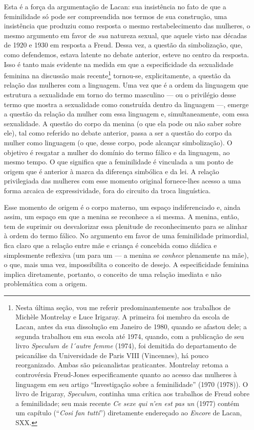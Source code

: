 Esta é a força da argumentação de Lacan: sua insistência no fato de que
a feminilidade só pode ser compreendida nos termos de sua construção,
uma insistência que produziu como resposta o mesmo restabelecimento das
mulheres, o mesmo argumento em favor de \emph{sua} natureza sexual, que
aquele visto nas décadas de 1920 e 1930 em resposta a Freud. Dessa vez,
a questão da simbolização, que, como defendemos, estava latente no
debate anterior, esteve no centro da resposta. Isso é tanto mais
evidente na medida em que a especificidade da sexualidade feminina na
discussão mais recente\footnote{Nesta última seção, vou me referir
  predominantemente aos trabalhos de Michèle Montrelay e Luce Irigaray.
  A primeira foi membro da escola de Lacan, antes da sua dissolução em
  Janeiro de 1980, quando se afastou dele; a segunda trabalhou em sua
  escola até 1974, quando, com a publicação de seu livro \emph{Speculum
  de l´autre femme} (1974), foi demitida do departamento de psicanálise
  da Universidade de Paris VIII (Vincennes), há pouco reorganizado.
  Ambas são psicanalistas praticantes. Montrelay retoma a controvérsia
  Freud-Jones especificamente quanto ao acesso das mulheres à linguagem
  em seu artigo ``Investigação sobre a feminilidade'' (1970 (1978)). O
  livro de Irigaray, \emph{Speculum}, continha uma crítica aos trabalhos
  de Freud sobre a feminilidade; seu mais recente \emph{Ce sexe qui n'en
  est pas un} (1977) contém um capítulo (``\emph{Cosi fan tutti}'')
  diretamente endereçado ao \emph{Encore} de Lacan, SXX.} tornou-se,
explicitamente, a questão da relação das mulheres com a linguagem. Uma
vez que é a ordem da linguagem que estrutura a sexualidade em torno do
termo masculino --- ou o privilégio desse termo que mostra a sexualidade
como construída dentro da linguagem ---, emerge a questão da relação da
mulher com essa linguagem e, simultaneamente, com essa sexualidade. A
questão do corpo da menina (o que ela pode ou não saber sobre ele), tal
como referido no debate anterior, passa a ser a questão do corpo da
mulher como linguagem (o que, desse corpo, pode alcançar simbolização).
O objetivo é resgatar a mulher do domínio do termo fálico e da
linguagem, ao mesmo tempo. O que significa que a feminilidade é
vinculada a um ponto de origem que é anterior à marca da diferença
simbólica e da lei. A relação privilegiada das mulheres com esse momento
original fornece-lhes acesso a uma forma arcaica de expressividade, fora
do circuito da troca linguística.

Esse momento de origem é o corpo materno, um espaço indiferenciado e,
ainda assim, um espaço em que a menina se reconhece a si mesma. A
menina, então, tem de suprimir ou desvalorizar essa plenitude de
reconhecimento para se alinhar à ordem do termo fálico. No argumento em
favor de uma feminilidade primordial, fica claro que a relação entre mãe
e criança é concebida como diádica e simplesmente reflexiva (um para um
--- a menina se \emph{conhece} plenamente na mãe), o que, mais uma vez,
impossibilita o conceito de desejo. A especificidade feminina implica
diretamente, portanto, o conceito de uma relação imediata e não
problemática com a origem.

